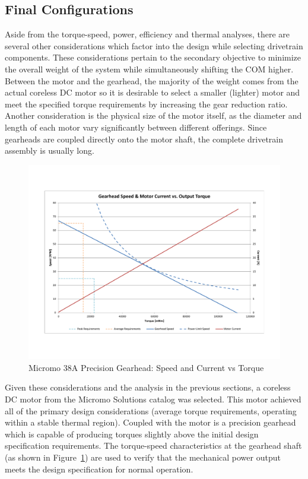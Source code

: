 \subsection{Final Configurations} %
\label{sub:final_configurations}
Aside from the torque-speed, power, efficiency and thermal analyses, there are several other considerations which factor into the design  while selecting drivetrain components. These considerations pertain to the secondary objective to minimize the overall weight of the system while simultaneously shifting the COM higher. Between the motor and the gearhead, the majority of the weight comes from the actual coreless DC motor so it is desirable to select a smaller (lighter) motor and meet the specified torque requirements by increasing the gear reduction ratio. Another consideration is the physical size of the motor itself, as the diameter and length of each motor vary significantly between different offerings. Since gearheads are coupled directly onto the motor shaft, the complete drivetrain assembly is usually long. 

\begin{figure}[!h]
	\begin{center}
    \includegraphics[trim = 20mm 30mm 20mm 30mm,clip,width=15cm]{fig/design/gearhead1.pdf}
	\end{center}
  \caption{Micromo 38A Precision Gearhead: Speed and Current vs Torque}
  \label{fig:micromo38a}
\end{figure}

Given these considerations and the analysis in the previous sections, a coreless DC motor from the Micromo Solutions catalog was selected. This motor achieved all of the primary design considerations (average torque requirements, operating within a stable thermal region). Coupled with the motor is a precision gearhead which is capable of producing torques slightly above the initial design specification requirements. The torque-speed characteristics at the gearhead shaft (as shown in Figure~\ref{fig:micromo38a}) are used to verify that the mechanical power output meets the design specification for normal operation. 

